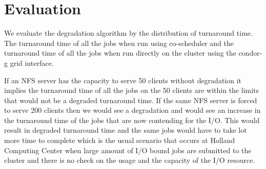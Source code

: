 \documentclass[ms,electronic,double]{nuthesis}
\begin{document}
\chapter{Evaluation}

We evaluate the degradation algorithm by the distribution of turnaround time. The turnaround 
time of all the jobs when run using co-scheduler and the turnaround time of all 
the jobs when run directly on the cluster using the condor-g grid interface.

If an NFS server has the capacity to serve 50 clients without degradation it
implies the turnaround time of all the jobs on the 50 clients are within the 
limits that would not be a degraded turnaround time. If the same NFS server is forced to serve 200 
clients then we would see a degradation and would see an increase in the turnaround time of the jobs
that are now contending for the I/O. This would result in degraded turnaround time and 
the same jobs would have to take lot more time to complete which is the usual 
scenario that occurs at Holland Computing Center when large amount of I/O bound 
jobs are submitted to the cluster and there is no check on the usage and the 
capacity of the I/O resource.
\end{document}
